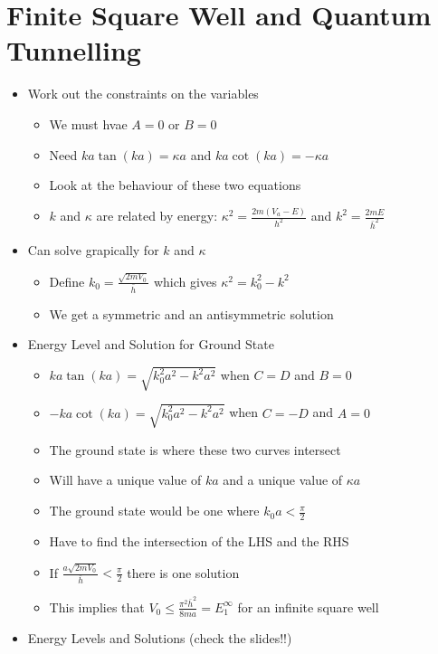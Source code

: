\documentclass[12pt]{article}
\begin{document}
\section{Finite Square Well and Quantum Tunnelling} \begin{itemize}
    \item Work out the constraints on the variables \begin{itemize}
        \item We must hvae $A = 0$ or $B = 0$
        \item Need $k a \tan (ka) = \kappa a$ and $ka \cot (ka) = - \kappa a$
        \item Look at the behaviour of these two equations
        \item $k$ and $\kappa$ are related by energy: $\kappa^2 = \frac{2m(V_a - E)}{h^2}$ and $k^2 = \frac{2mE}{\bar{h}^2}$
    \end{itemize}
    \item Can solve grapically for $k$ and $\kappa$ \begin{itemize}
        \item Define $k_0 = \frac{\sqrt{2mV_0}}{\bar{h}}$ which gives $\kappa^2 = k_0^2 - k^2$
        \item We get a symmetric and an antisymmetric solution 
    \end{itemize}
    \item Energy Level and Solution for Ground State \begin{itemize}
        \item $ka \tan (ka) = \sqrt{k_0^2 a^2 - k^2a^2}$ when $C = D$ and $B = 0$
        \item $-ka \cot (ka) = \sqrt{k_0^2 a^2 - k^2a^2}$ when $C = -D$ and $A = 0$
        \item The ground state is where these two curves intersect
        \item Will have a unique value of $ka$ and a unique value of $\kappa a$
        \item The ground state would be one where $k_0 a < \frac{\pi}{2}$
        \item Have to find the intersection of the LHS and the RHS
        \item If $\frac{a \sqrt{2mV_0}}{\bar{h}} < \frac{\pi}{2}$ there is one solution 
        \item This implies that $V_0 \leq \frac{\pi^2 \bar{h}^2}{8ma} = E_1^{\infty}$ for an infinite square well
    \end{itemize}
    \item Energy Levels and Solutions (check the slides!!)

\end{itemize}
\end{document}
